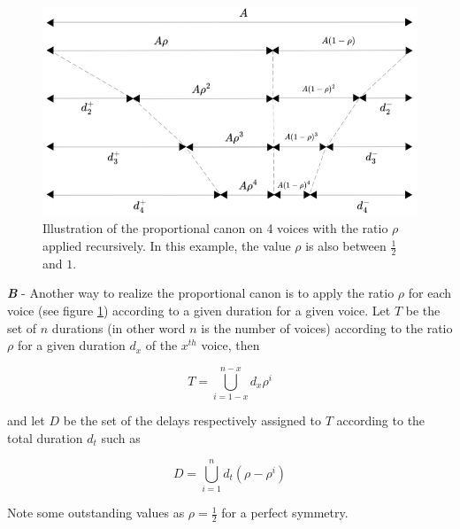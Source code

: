 \begin{figure}[h]
\begin{center}
\includegraphics[scale=0.8]{img/3498}
\caption{Illustration of the proportional canon on 4 voices with the ratio $\rho$ applied recursively. In this example, the value $\rho$ is also between $\frac{1}{2}$ and $1$. 
}
\label{canon2}
\end{center}
\end{figure}

  
\textbf{\textit{B}} - Another way to realize the proportional canon is to apply the ratio $\rho$ for each voice (see figure \ref{canon2}) according to a given duration for a given voice. Let $T$ be the set of $n$ durations (in other word $n$ is the number of voices) according to the ratio $\rho$ for a given duration $d_x$ of the $x^{th}$ voice, then

\[
T= \displaystyle \bigcup\limits_{i=1-x}^{n-x} d_x \rho^i 
 \]


\noindent and let $D$ be the set of the delays respectively assigned to $T$ according to the total duration $d_t$ such as

\[
     D =
   \displaystyle \bigcup\limits_{i=1}^{n} d_t (\rho-\rho^i) 
    \]

\bigskip

Note some outstanding values as $\rho=\frac{1}{2}$ for a perfect symmetry.

